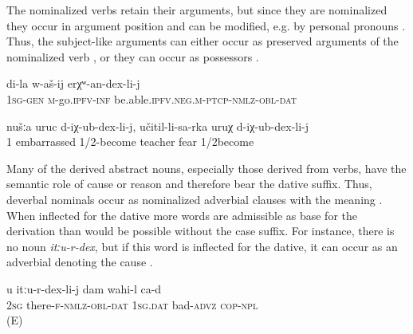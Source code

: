 The nominalized verbs retain their arguments, but since they are nominalized they occur in argument position and can be modified, e.g. by personal pronouns . Thus, the subject-like arguments can either occur as preserved arguments of the nominalized verb ,  or they can occur as possessors .
%
\begin{exe} 
	\ex	\label{because of my inability to walk}
	\gll	di-la	w-aš-ij	erχʷ-an-dex-li-j \\
		1\textsc{sg}-\textsc{gen}	\textsc{m}-go.\textsc{ipfv}-\textsc{inf} be.able.\textsc{ipfv}.\textsc{neg}.\textsc{m}-\textsc{ptcp}-\textsc{nmlz}-\textsc{obl}-\textsc{dat}\\
	\glt	{}

	\ex	\label{because of our embarrassment, because of our fear of the teacher}
	\gll	nušːa	uruc	d-iχ-ub-dex-li-j,	učitil-li-sa-rka	uruχ	d-iχ-ub-dex-li-j\\
		1 embarrassed 1/2-become	teacher	fear	1/2become\\
	\glt	{}
\end{exe}

Many of the derived abstract nouns, especially those derived from verbs, have the semantic role of cause or reason and therefore bear the dative suffix. Thus, deverbal nominals occur as nominalized adverbial clauses with the meaning . When inflected for the dative more words are admissible as base for the derivation than would be possible without the case suffix. For instance, there is no noun \textit{itːu-r-dex}, but if this word is inflected for the dative, it can occur as an adverbial denoting the cause .
%
\begin{exe}
	\ex	\label{Because you are there I feel bad}
	\gll	u itːu-r-dex-li-j dam wahi-l ca-d \\
		2\textsc{sg}	there-\textsc{f-nmlz-obl}-\textsc{dat}	1\textsc{sg}.\textsc{dat}	bad-\textsc{advz} \textsc{cop-npl}\\
	\glt	{} (E)
\end{exe}



